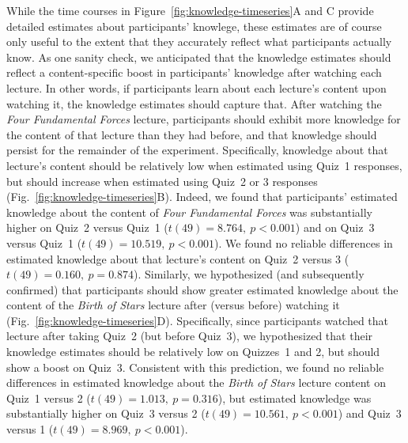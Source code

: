 \documentclass[10pt]{article}
\begin{document}
While the time courses in Figure~\ref{fig:knowledge-timeseries}A and C provide
detailed estimates about participants' knowlege, these estimates are
of course only useful to the extent that they accurately reflect what
participants actually know. As one sanity check, we anticipated that the
knowledge estimates should reflect a content-specific boost in
participants' knowledge after watching each lecture. In other words, if
participants learn about each lecture's content upon watching it,
the knowledge estimates should capture that. After watching the \textit{Four
Fundamental Forces} lecture, participants should exhibit more knowledge for the
content of that lecture than they had before, and that knowledge should persist
for the remainder of the experiment. Specifically, knowledge about that
lecture's content should be relatively low when estimated using Quiz~1
responses, but should increase when estimated using Quiz~2 or 3 responses
(Fig.~\ref{fig:knowledge-timeseries}B). Indeed, we found that participants'
estimated knowledge about the content of \textit{Four Fundamental Forces}
was substantially higher on Quiz~2 versus Quiz~1 ($t(49) = 8.764,~p < 0.001$)
and on Quiz~3 versus Quiz~1 ($t(49) = 10.519,~p < 0.001$). We found no reliable
differences in estimated knowledge about that lecture's content on Quiz~2
versus 3 ($t(49) = 0.160,~p = 0.874$). Similarly, we hypothesized (and
subsequently confirmed) that participants should show greater estimated
knowledge about the content of the \textit{Birth of Stars} lecture after
(versus before) watching it (Fig.~\ref{fig:knowledge-timeseries}D).
Specifically, since participants watched that lecture after taking Quiz~2 (but
before Quiz~3), we hypothesized that their knowledge estimates should be
relatively low on Quizzes~1 and 2, but should show a boost on Quiz~3.
Consistent with this prediction, we found no reliable differences in estimated
knowledge about the \textit{Birth of Stars} lecture content on Quiz~1 versus
2 ($t(49) = 1.013,~p = 0.316$), but estimated knowledge was substantially
higher on Quiz~3 versus 2 ($t(49) = 10.561,~p < 0.001$) and Quiz~3 versus 1
($t(49) = 8.969,~p < 0.001$).
\end{document}
